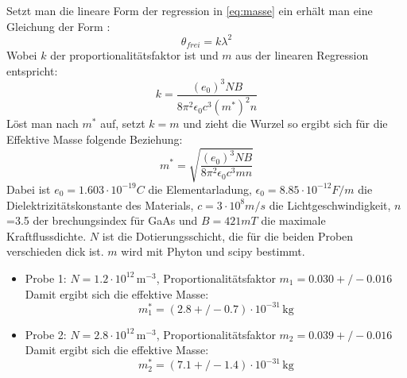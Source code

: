 Setzt man die lineare Form der regression in \eqref{eq:masse} ein erhält man eine Gleichung der Form :
\begin{equation}
    \theta_{frei}=k\lambda^2
\end{equation}
Wobei $k$ der proportionalitätsfaktor ist und $m$ aus der linearen Regression entspricht:
\begin{equation}
    k=\frac{(e_0)^3NB}{8\pi^2\epsilon_0 c^3(m^*)^2 n}
\end{equation}
Löst man nach $m^*$ auf, setzt $k=m$ und zieht die Wurzel so ergibt sich für die Effektive Masse 
folgende Beziehung:
\begin{equation}
    m^*=\sqrt{\frac{(e_0)^3NB}{8\pi^2 \epsilon_0 c^3 m n}}
\end{equation}   
Dabei ist $e_0=1.603\cdot10^{-19}C$ die Elementarladung, $\epsilon_0=8.85\cdot10^{-12}F/m$ die Dielektrizitätskonstante des Materials,
$c=3\cdot10^8 m/s$ die Lichtgeschwindigkeit, $n$=3.5 der brechungsindex für GaAs und $B= 421 mT$ die maximale Kraftflussdichte.
$N$ ist die Dotierungsschicht, die für die beiden Proben verschieden dick ist.
$m$ wird mit Phyton und scipy bestimmt.

\begin{itemize} 
    \item Probe 1: \(N = 1.2 \cdot 10^{12} \, \text{m}^{-3}\), Proportionalitätsfaktor \(m_1 =  0.030+/-0.016\)
Damit ergibt sich die effektive Masse:
\begin{equation} m^*_1 = (2.8+/-0.7) \cdot 10^{-31} \, \text{kg}
\end{equation}
\item Probe 2: \(N = 2.8 \cdot 10^{12} \, \text{m}^{-3}\), Proportionalitätsfaktor \(m_2 = 0.039+/-0.016\)
Damit ergibt sich die effektive Masse:
\begin{equation} m^*_2 = (7.1+/-1.4)\cdot 10^{-31} \, \text{kg} 
\end{equation} 
\end{itemize}

    
    














